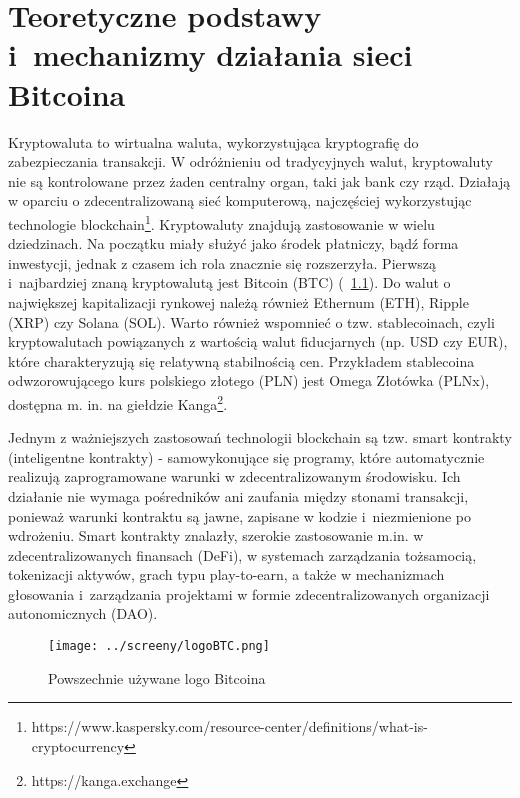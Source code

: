 \documentclass[12pt,a4paper]{report}
\theoremstyle{definition} %
\begin{document}
	\chapter{Teoretyczne podstawy i~mechanizmy działania sieci Bitcoina}
	\hspace*{\parindent}Kryptowaluta to wirtualna waluta, wykorzystująca kryptografię do zabezpieczania transakcji. W odróżnieniu od tradycyjnych walut, kryptowaluty nie są kontrolowane przez żaden centralny organ, taki jak bank czy rząd. Działają w oparciu o zdecentralizowaną sieć komputerową, najczęściej wykorzystując technologie 					blockchain\footnote{https://www.kaspersky.com/resource-center/definitions/what-is-cryptocurrency}. Kryptowaluty znajdują zastosowanie w wielu dziedzinach. Na początku miały służyć jako środek płatniczy, bądź forma inwestycji, jednak z czasem ich rola znacznie się rozszerzyła. Pierwszą i~najbardziej znaną kryptowalutą jest Bitcoin (BTC) (\figurename~\ref{fig:logoBTC}). Do walut o największej kapitalizacji rynkowej należą również Ethernum (ETH), Ripple (XRP) czy Solana (SOL). Warto również wspomnieć o tzw. stablecoinach, czyli kryptowalutach powiązanych z wartością walut fiducjarnych (np. USD czy EUR), które charakteryzują się relatywną stabilnością cen. Przykładem stablecoina odwzorowującego kurs polskiego złotego (PLN) jest Omega Złotówka (PLNx), dostępna m. in. na giełdzie Kanga\footnote{https://kanga.exchange}.

\enlargethispage{2\baselineskip}Jednym z ważniejszych zastosowań technologii blockchain są tzw. smart kontrakty (inteligentne kontrakty) - samowykonujące się programy, które automatycznie realizują zaprogramowane warunki w zdecentralizowanym środowisku. Ich działanie nie wymaga pośredników ani zaufania między stonami transakcji, ponieważ warunki kontraktu są jawne, zapisane w kodzie i~niezmienione po wdrożeniu. Smart kontrakty znalazły, szerokie zastosowanie m.in. w zdecentralizowanych finansach (DeFi), w systemach zarządzania tożsamocią, tokenizacji aktywów, grach typu play-to-earn, a także w mechanizmach głosowania i~zarządzania projektami w formie zdecentralizowanych organizacji autonomicznych (DAO).

	\begin{figure}[H]
	    \centering
	    \texttt{[image: ../screeny/logoBTC.png]} 
	    \caption{Powszechnie używane logo Bitcoina}
	    \label{fig:logoBTC}
	\end{figure}
\end{document}
